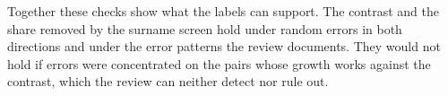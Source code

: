 \documentclass[12pt]{article}
\begin{document}
Together these checks show what the labels can support. The contrast and the share removed by the surname screen hold under random errors in both directions and under the error patterns the review documents. They would not hold if errors were concentrated on the pairs whose growth works against the contrast, which the review can neither detect nor rule out.




\clearpage
\begingroup\small\singlespacing\raggedright\endgroup
\end{document}
